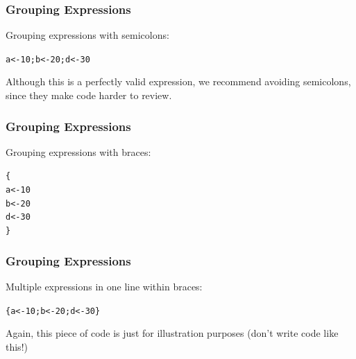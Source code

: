 \documentclass[12pt]{beamer}\usepackage[]{graphicx}\usepackage[]{color}
\makeatletter
\newcommand{\hlnum}[1]{\textcolor[rgb]{0.686,0.059,0.569}{#1}}%
\newcommand{\hlstd}[1]{\textcolor[rgb]{0.345,0.345,0.345}{#1}}%
\newcommand{\hlkwb}[1]{\textcolor[rgb]{0.69,0.353,0.396}{#1}}%
\newenvironment{kframe}{%
 \def\at@end@of@kframe{}%
 \ifinner\ifhmode%
  \def\at@end@of@kframe{\end{minipage}}%
  \begin{minipage}{\columnwidth}%
 \fi\fi%
 \def\FrameCommand##1{\hskip\@totalleftmargin \hskip-\fboxsep
 \colorbox{shadecolor}{##1}\hskip-\fboxsep
     \hskip-\linewidth \hskip-\@totalleftmargin \hskip\columnwidth}%
 \MakeFramed {\advance\hsize-\width
   \@totalleftmargin\z@ \linewidth\hsize
   \@setminipage}}%
 {\par\unskip\endMakeFramed%
 \at@end@of@kframe}
\newenvironment{knitrout}{}{} %
\makeatother
\begin{document}
\begin{frame}[fragile]
\frametitle{Grouping Expressions}

Grouping expressions with semicolons:
\begin{knitrout}\footnotesize
{}\color{fgcolor}\begin{kframe}
\begin{alltt}
\hlstd{a} \hlkwb{<-} \hlnum{10}\hlstd{; b} \hlkwb{<-} \hlnum{20}\hlstd{; d} \hlkwb{<-} \hlnum{30}
\end{alltt}
\end{kframe}
\end{knitrout}

Although this is a perfectly valid expression, we recommend avoiding semicolons,
since they make code harder to review.

\end{frame}


\begin{frame}[fragile]
\frametitle{Grouping Expressions}

Grouping expressions with braces:
\begin{knitrout}\footnotesize
{}\color{fgcolor}\begin{kframe}
\begin{alltt}
\hlstd{\{}
  \hlstd{a} \hlkwb{<-} \hlnum{10}
  \hlstd{b} \hlkwb{<-} \hlnum{20}
  \hlstd{d} \hlkwb{<-} \hlnum{30}
\hlstd{\}}
\end{alltt}
\end{kframe}
\end{knitrout}

\end{frame}


\begin{frame}[fragile]
\frametitle{Grouping Expressions}

Multiple expressions in one line within braces:
\begin{knitrout}\footnotesize
{}\color{fgcolor}\begin{kframe}
\begin{alltt}
\hlstd{\{a} \hlkwb{<-} \hlnum{10}\hlstd{; b} \hlkwb{<-} \hlnum{20}\hlstd{; d} \hlkwb{<-} \hlnum{30}\hlstd{\}}
\end{alltt}
\end{kframe}
\end{knitrout}

Again, this piece of code is just for illustration purposes (don't write code
like this!)

\end{frame}
\end{document}
